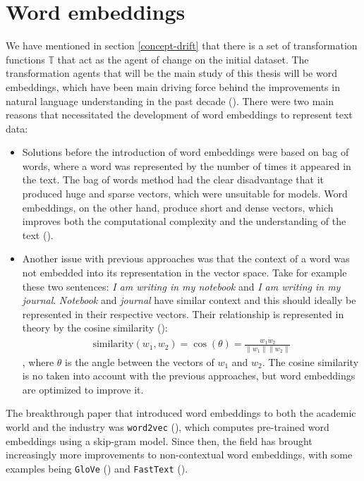 \documentclass[12pt]{extreport}
\begin{document}
\section{Word embeddings}

We have mentioned in section \ref{concept-drift} that there is a set of transformation functions $\mathbb{T}$ that act as the agent of change on the initial dataset. The transformation agents that will be the main study of this thesis will be word embeddings, which have been main driving force behind the improvements in natural language understanding in the past decade (\cite{word-embedding-survey}). There were two main reasons that necessitated the development of word embeddings to represent text data:

\begin{itemize}
    \item Solutions before the introduction of word embeddings were based on bag of words, where a word was represented by the number of times it appeared in the text. The bag of words method had the clear disadvantage that it produced huge and sparse vectors, which were unsuitable for models. Word embeddings, on the other hand, produce short and dense vectors, which improves both the computational complexity and the understanding of the text (\cite{word-embedding-survey, word2vec}).
    \item Another issue with previous approaches was that the context of a word was not embedded into its representation in the vector space. Take for example these two sentences: \emph{I am writing in my notebook} and \emph{I am writing in my journal}. \emph{Notebook} and \emph{journal} have similar context and this should ideally be represented in their respective vectors. Their relationship is represented in theory by the cosine similarity (\cite{word2vec}): \begin{align}\text{similarity}(w_1, w_2) = \cos(\theta) = \frac{w_1 \dot w_2}{\lVert w_1 \rVert \lVert w_2 \rVert}\end{align}, where $\theta$ is the angle between the vectors of $w_1$ and $w_2$. The cosine similarity is no taken into account with the previous approaches, but word embeddings are optimized to improve it.
\end{itemize}

The breakthrough paper that introduced word embeddings to both the academic world and the industry was \texttt{word2vec} (\cite{word2vec}), which computes pre-trained word embeddings using a skip-gram model. Since then, the field has brought increasingly more improvements to non-contextual word embeddings, with some examples being \texttt{GloVe} (\cite{glove}) and \texttt{FastText} (\cite{fasttext}).
\end{document}
